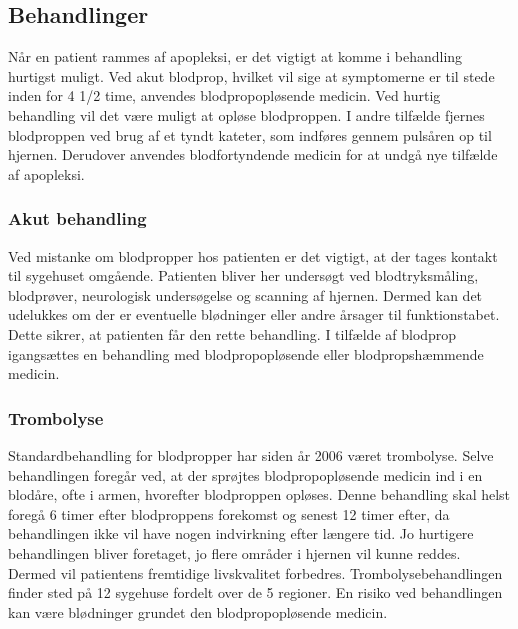 \subsection{Behandlinger}
Når en patient rammes af apopleksi, er det vigtigt at komme i behandling hurtigst muligt. Ved akut blodprop, hvilket vil sige at symptomerne er til stede inden for 4 1/2 time, anvendes blodpropopløsende medicin. Ved hurtig behandling vil det være muligt at opløse blodproppen. I andre tilfælde fjernes blodproppen ved brug af et tyndt kateter, som indføres gennem pulsåren op til hjernen. Derudover anvendes blodfortyndende medicin for at undgå nye tilfælde af apopleksi. \cite{Hjerteforeningen2014} \cite{Kruuse2014a}

\subsubsection{Akut behandling}
Ved mistanke om blodpropper hos patienten er det vigtigt, at der tages kontakt til sygehuset omgående. Patienten bliver her undersøgt ved blodtryksmåling, blodprøver, neurologisk undersøgelse og scanning af hjernen. Dermed kan det udelukkes om der er eventuelle blødninger eller andre årsager til funktionstabet. Dette  sikrer, at patienten får den rette behandling. I tilfælde af blodprop igangsættes en behandling med blodpropopløsende eller blodpropshæmmende medicin. \cite{Hjerteforeningen2014} \cite{Kruuse2014a} 

\subsubsection{Trombolyse}
Standardbehandling for blodpropper har siden år 2006 været trombolyse. Selve behandlingen foregår ved, at der sprøjtes blodpropopløsende medicin ind i en blodåre, ofte i armen, hvorefter blodproppen opløses. Denne behandling skal helst foregå 6 timer efter blodproppens forekomst og senest 12 timer efter, da behandlingen ikke vil have nogen indvirkning efter længere tid. Jo hurtigere behandlingen bliver foretaget, jo flere områder i hjernen vil kunne reddes. Dermed vil patientens fremtidige livskvalitet forbedres. Trombolysebehandlingen finder sted på 12 sygehuse fordelt over de 5 regioner. En risiko ved behandlingen kan være blødninger grundet den blodpropopløsende medicin.\cite{Hjernesagen2015b} 

